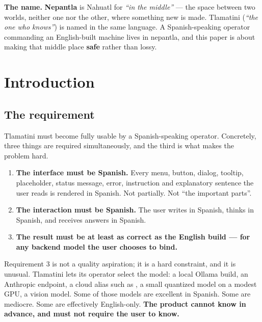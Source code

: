 
\begin{keyinsight}
\textbf{The name.}
\textbf{Nepantla} is Nahuatl for \emph{``in the middle''} --- the space between two worlds, neither one nor the other, where something new is made. Tlamatini (\emph{``the one who knows''}) is named in the same language. A Spanish-speaking operator commanding an English-built machine lives in nepantla, and this paper is about making that middle place \textbf{safe} rather than lossy.
\end{keyinsight}

\section{Introduction}
\label{sec:introduction}

\subsection{The requirement}
\label{sec:the-requirement}

Tlamatini must become fully usable by a Spanish-speaking operator. Concretely, three things are required simultaneously, and the third is what makes the problem hard.

\begin{enumerate}
  \item \textbf{The interface must be Spanish.} Every menu, button, dialog, tooltip, placeholder, status message, error, instruction and explanatory sentence the user reads is rendered in Spanish. Not partially. Not ``the important parts''.
  \item \textbf{The interaction must be Spanish.} The user writes in Spanish, thinks in Spanish, and receives answers in Spanish.
  \item \textbf{The result must be at least as correct as the English build --- for any backend model the user chooses to bind.}
\end{enumerate}

Requirement 3 is not a quality aspiration; it is a hard constraint, and it is unusual. Tlamatini lets its operator select the model: a local Ollama build, an Anthropic endpoint, a cloud alias such as , a small quantized model on a modest GPU, a vision model. Some of those models are excellent in Spanish. Some are mediocre. Some are effectively English-only. \textbf{The product cannot know in advance, and must not require the user to know.}

